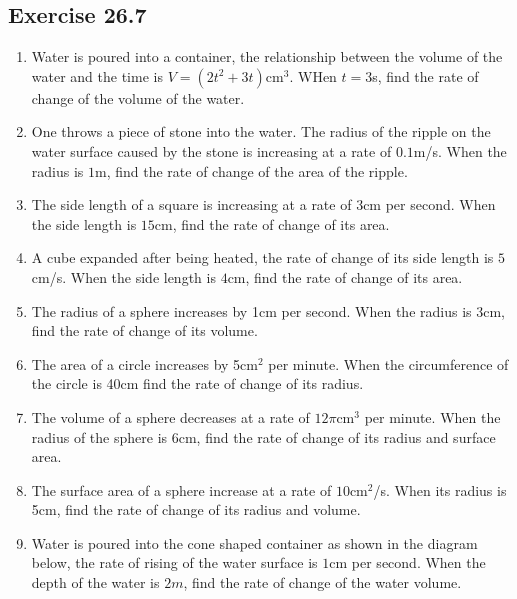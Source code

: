 \documentclass{report}
\begin{document}
\subsection{Exercise 26.7}
\begin{enumerate}
    \item Water is poured into a container, the relationship between the volume of the
          water and the time is $V = (2t^2 + 3t)$cm$^3$. WHen $t = 3$s, find the rate of
          change of the volume of the water.
    \item One throws a piece of stone into the water. The radius of the ripple on the
          water surface caused by the stone is increasing at a rate of $0.1$m/s. When the
          radius is $1$m, find the rate of change of the area of the ripple.
    \item The side length of a square is increasing at a rate of $3$cm per second. When
          the side length is $15$cm, find the rate of change of its area.
    \item A cube expanded after being heated, the rate of change of its side length is
          $5$cm/s. When the side length is $4$cm, find the rate of change of its area.
    \item The radius of a sphere increases by 1cm per second. When the radius is 3cm,
          find the rate of change of its volume.
    \item The area of a circle increases by 5cm$^2$ per minute. When the circumference of
          the circle is 40cm find the rate of change of its radius.
    \item The volume of a sphere decreases at a rate of $12\pi$cm$^3$ per minute. When
          the radius of the sphere is 6cm, find the rate of change of its radius and
          surface area.
    \item The surface area of a sphere increase at a rate of $10$cm$^2$/s. When its
          radius is 5cm, find the rate of change of its radius and volume.
    \item Water is poured into the cone shaped container as shown in the diagram below,
          the rate of rising of the water surface is $1$cm per second. When the depth of
          the water is $2m$, find the rate of change of the water volume.
          \begin{center}

\end{center}
\end{enumerate}
\end{document}
